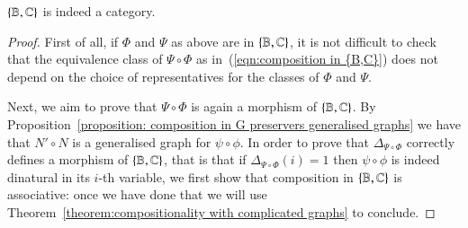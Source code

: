 \begin{theorem}\label{theorem: {B,C} is a category}
    $\{ \mathbb B,\mathbb C\}$ is indeed a category.
\end{theorem}
\begin{proof}
    First of all, if $\Phi$ and $\Psi$ as above are in $\{ \mathbb B,\mathbb C\}$, it is not difficult to check that the equivalence class of $\Psi \circ \Phi$ as in~(\ref{eqn:composition in {B,C}}) does not depend on the choice of representatives for the classes of $\Phi$ and $\Psi$.
     
    Next, we aim to prove that $\Psi \circ \Phi$ is again a morphism of $\{ \mathbb B,\mathbb C\}$. By Proposition~\ref{proposition: composition in G preservers generalised graphs} we have that ${N'} \circ N$ is a generalised graph for $\psi\circ\phi$. In order to prove that $\Delta_{\Psi\circ\Phi}$ correctly defines a morphism of $\{ \mathbb B,\mathbb C\}$, that is that if $\Delta_{\Psi\circ\Phi}(i)=1$ then $\psi\circ\phi$ is indeed dinatural in its $i$-th variable, we first show that composition in $\{ \mathbb B,\mathbb C\}$ is associative: once we have done that we will use Theorem~\ref{theorem:compositionality with complicated graphs} to conclude.
    

\end{proof}
